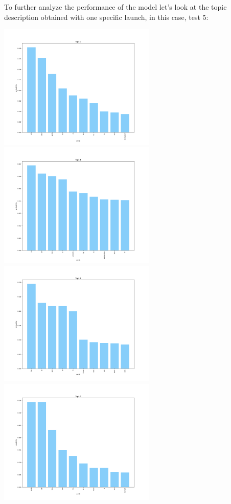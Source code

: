 \documentclass[10pt]{article} %
\begin{document}
	To further analyze the performance of the model let's look at the topic description obtained with one specific launch, in this case, test 5:
	
	\begin{center}
		\includegraphics[width=7.5cm]{images/plots/test_5/topic_0.png}
		\includegraphics[width=7.5cm]{images/plots/test_5/topic_1.png}
		\includegraphics[width=7.5cm]{images/plots/test_5/topic_2.png}
		\includegraphics[width=7.5cm]{images/plots/test_5/topic_3.png}

\end{center}
\end{document}
